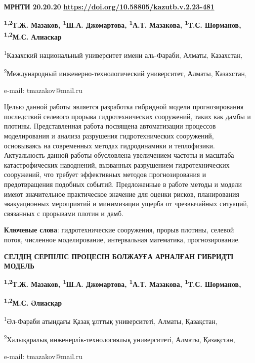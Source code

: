 \newpage
{}
{\bfseries МРНТИ 20.20.20}
\hfill {\bfseries \href{https://doi.org/10.58805/kazutb.v.2.23-481}{https://doi.org/10.58805/kazutb.v.2.23-481}}


\begin{center}
{\bfseries \textsuperscript{1,2}Т.Ж. Мазаков\envelope, \textsuperscript{1}Ш.А.
Джомартова, \textsuperscript{1}А.Т. Мазакова, \textsuperscript{1}Т.С.
Шорманов, \textsuperscript{1,2}М.С. Алиаскар}

\textsuperscript{1}Казахский национальный университет имени аль-Фараби,
Алматы, Казахстан,

\textsuperscript{2}Международный инженерно-технологический университет,
Алматы, Казахстан,

e-mail: tmazakov@mail.ru
\end{center}

Целью данной работы является разработка гибридной модели прогнозирования
последствий селевого прорыва гидротехнических сооружений, таких как
дамбы и плотины. Представленная работа посвящена автоматизации процессов
моделирования и анализа разрушения гидротехнических сооружений,
основываясь на современных методах гидродинамики и теплофизики.
Актуальность данной работы обусловлена увеличением частоты и масштаба
катастрофических наводнений, вызванных разрушением гидротехнических
сооружений, что требует эффективных методов прогнозирования и
предотвращения подобных событий. Предложенные в работе методы и модели
имеют значительное практическое значение для оценки рисков, планирования
эвакуационных мероприятий и минимизации ущерба от чрезвычайных ситуаций,
связанных с прорывами плотин и дамб.

{\bfseries Ключевые слова}: гидротехнические сооружения, прорыв плотины,
селевой поток, численное моделирование, интервальная математика,
прогнозирование.

\begin{center}
{\large\bfseries СЕЛДІҢ СЕРПІЛІС ПРОЦЕСІН БОЛЖАУҒА АРНАЛҒАН ГИБРИДТІ МОДЕЛЬ}

{\bfseries \textsuperscript{1,2}Т.Ж. Мазаков\envelope, \textsuperscript{1}Ш.А.
Джомартова, \textsuperscript{1}А.Т. Мазакова, \textsuperscript{1}Т.С.
Шорманов,}

{\bfseries \textsuperscript{1,2}М.С. Әлиасқар}

\textsuperscript{1}Әл-Фараби атындағы Қазақ ұлттық университеті, Алматы,
Қазақстан,

\textsuperscript{2}Халықаралық инженерлік-технологиялық университеті,
Алматы, Қазақстан,

e-mail: tmazakov@mail.ru
\end{center}

